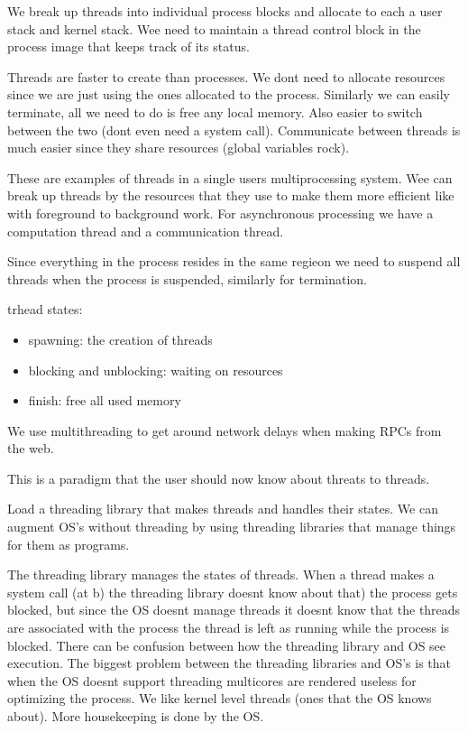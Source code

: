 \documentclass[12pt]{article}
\begin{document}







We break up threads into individual process blocks and allocate to each a user stack and kernel stack. Wee need to maintain a thread control block in the process image that keeps track of its status.

Threads are faster to create than processes. We dont need to allocate resources since we are just using the ones allocated to the process. Similarly we can easily terminate, all we need to do is free any local memory. Also easier to switch between the two (dont even need a system call). Communicate between threads is much easier since they share resources (global variables rock).

These are examples of threads in a single users multiprocessing system. Wee can break up threads by the resources that they use to make them more efficient like with foreground to background work. For asynchronous processing we have a computation thread and a communication thread.

Since everything in the process resides in the same regieon we need to suspend all threads when the process is suspended, similarly for termination.

trhead states:
\begin{itemize}
    \item spawning: the creation of threads
    \item blocking and unblocking: waiting on resources
    \item finish: free all used memory
\end{itemize}


We use multithreading to get around network delays when making RPCs from the web.


This is a paradigm that the user should now know about threats to threads.

Load a threading library that makes threads and handles their states. We can augment OS's without threading by using threading libraries that manage things for them as programs.

The threading library manages the states of threads. When a thread makes a system call (at  b) the threading library doesnt know about that) the process gets blocked, but since the OS doesnt manage threads it doesnt know that the threads are associated with the process the thread is left as running while the process is blocked. There can be confusion between how the threading library and OS see execution. The biggest problem between the threading libraries and OS's is that when the OS doesnt support threading multicores are rendered useless for optimizing the process. We like kernel level threads (ones that the OS knows about). More housekeeping is done by the OS.
\end{document}
